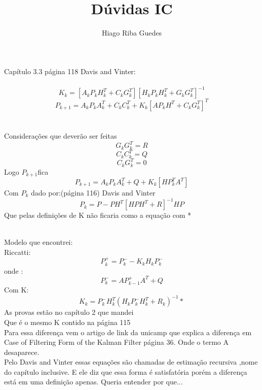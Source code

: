 \documentclass{article}
\title{Dúvidas  IC}
\author{Hiago Riba Guedes }
\begin{document}
\maketitle
Capítulo 3.3 página 118 Davis and Vinter:\\\\
$$K_k=[A_kP_kH^T_k +C_kG^T_k][H_kP_kH^T_k+G_kG^T_k]^{-1}$$
$$P_{k+1}=A_kP_kA^T_k+C_kC^T_k + K_k[AP_kH^T +C_kG^T_k]^T$$\\
\\
Considerações que deverão ser feitas\\
$$G_kG_k^T=R$$
$$C_kC_k^T=Q$$
$$C_kG_k^T=0$$
Logo $P_{k+1}$fica
$$P_{k+1}=A_kP_kA^T_k+ Q + K_k[HP_k^TA^T]$$
Com $P_k$ dado por:(página 116) Davis and Vinter\\

$$P_{k}=P-PH^T[HPH^T + R]^{-1}HP $$
Que pelas definições de K não ficaria como a equação com *\\
\\
Modelo que encontrei:\\
Riccatti:\\
$$P_k^+=P_k^- -K_kH_kP_k^-$$
onde :\\
$$P_k^-=AP_{k-1}^+A^T + Q$$
Com K:\\
$$K_k=P_k^-H_k^T(H_kP_k^-H_k^T+R_k)^{-1} *$$
As provas estão no capítulo 2 que mandei\\
Que é o mesmo K contido na página 115\\

Para essa diferença vem o artigo de link da unicamp que explica a diferença em Case of Filtering Form of the Kalman Filter página 36. Onde o termo A desaparece.\\
Pelo Davis and Vinter essas equações são chamadas de estimação recursiva ,nome do capítulo inclusive. E ele diz que essa forma é satisfatória porém a diferença está em uma definição apenas. Queria entender por que...
\end{document}
